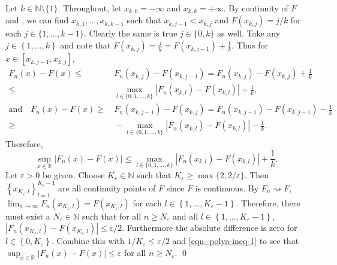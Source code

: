 Let \(k \in \mathbb{N} \setminus \{1\}\).
Throughout, let \(x_{k, 0} = - \infty\) and \(x_{k, k} = + \infty\).
By continuity of \(F\) and , we can find
\(x_{k, 1}, \dots, x_{k, k - 1}\) such that \(x_{k, j - 1} < x_{k, j}\) and
\(F \left( x_{k, j} \right) = j / k\) for each \(j \in \{1, \dots, k - 1\}\).
Clearly the same is true \(j \in \{0, k\}\) as well.
Take any \(j \in \left\{ 1, \dots, k \right\}\) and note that
\(F \left( x_{k, j} \right) = \frac{j}{k} = F \left( x_{k, j - 1} \right) +
\frac{1}{k}\).
Thus for \(x \in \left[ x_{k, j - 1}, x_{k, j} \right]\),
\begin{align*}
  F_{n} (x) - F (x) \leq
  & \, F_{n} \left( x_{k, j} \right) - F \left( x_{k, j - 1} \right) = F_{n}
  \left( x_{k, j} \right) - F \left( x_{k, j} \right) + \frac{1}{k} \\
  \leq
  & \, \max_{l \in \{0, 1, \dots, k\}} \left| F_{n} \left( x_{k, l} \right) - F
  \left( x_{k, l} \right) \right| + \frac{1}{k}, \\
  \text{and} \quad
  F_{n} (x) - F (x) \geq
  & \, F_{n} \left( x_{k, j - 1} \right) - F \left( x_{k, j} \right) = F_{n}
  \left( x_{k, j - 1} \right) - F \left( x_{k, j - 1} \right) - \frac{1}{k} \\
  \geq
  & \, - \max_{l \in \{0, 1, \dots, k\}} \left| F_{n} \left( x_{k, l}
  \right) - F \left( x_{k, l} \right) \right| - \frac{1}{k}.
\end{align*}
Therefore,
\begin{equation}
  \sup_{x \in \mathbb{R}} \left| F_{n} (x) - F (x) \right| \leq
  \max_{l \in \{0, 1, \dots, k\}} \left| F_{n} \left( x_{k, l}
  \right) - F \left( x_{k, l} \right) \right| + \frac{1}{k}.
  \label{eqn--polya-ineq-1}
\end{equation}
Let \(\varepsilon > 0\) be given.
Choose \(K_{\varepsilon} \in \mathbb{N}\) such that \(K_{\varepsilon} \geq
\max\{2, 2 / \varepsilon\}\).
Then \(\left\{ x_{K_{\varepsilon}, l} \right\}_{l =
1}^{K_{\varepsilon} - 1}\) are all continuity points of \(F\) since \(F\) is
continuous.
By \(F_{n} \rightsquigarrow F\), \(\lim_{n \to \infty} F_{n} \left(
x_{K_{\varepsilon}, l} \right) = F \left( x_{K_{\varepsilon}, l} \right)\) for
each \(l \in \left\{ 1, \dots, K_{\varepsilon} - 1 \right\}\).
Therefore, there must exist a \(N_{\varepsilon} \in \mathbb{N}\) such that for
all \(n \geq N_{\varepsilon}\)
and all \(l \in \left\{ 1, \dots, K_{\varepsilon} - 1 \right\}\),
\(\left| F_{n} \left( x_{K_{\varepsilon}, l} \right) - F
\left(x_{K_{\varepsilon}, l} \right) \right| \leq \varepsilon / 2\).
Furthermore the absolute difference is zero for \(l \in \left\{ 0,
K_{\varepsilon} \right\}\).
Combine this with \(1 / K_{\varepsilon} \leq \varepsilon / 2\) and
\eqref{eqn--polya-ineq-1} to see that
\(\sup_{x \in \mathbb{R}} \left| F_{n} (x) - F (x) \right| \leq \varepsilon\)
for all \(n \geq N_{\varepsilon}\).
\qed

